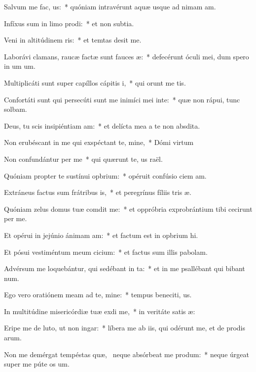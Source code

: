 \item Salvum me fac, us:~* quóniam intravérunt aquæ usque ad nimam am.
\item Infíxus sum in limo prodi:~* et non  subtia.
\item Veni in altitúdinem ris:~* et temtas desit me.
\item Laborávi clamans, raucæ factæ sunt fauces æ:~* defecérunt óculi mei, dum spero in um um.
\item Multiplicáti sunt super capíllos cápitis i,~* qui orunt me tis.
\item Confortáti sunt qui persecúti sunt me inimíci mei inte:~* quæ non rápui, tunc solbam.
\item Deus, tu scis insipiéntiam am:~* et delícta mea a te non  absdita.
\item Non erubéscant in me qui exspéctant te, mine,~* Dómi virtum
\item Non confundántur per me~* qui quærunt te, us raël.
\item Quóniam propter te sustínui opbrium:~* opéruit confúsio ciem am.
\item Extráneus factus sum frátribus is,~* et peregrínus fíliis tris æ.
\item Quóniam zelus domus tuæ comdit me:~* et oppróbria exprobrántium tibi cecirunt per me.
\item Et opérui in jejúnio ánimam am:~* et factum est in opbrium hi.
\item Et pósui vestiméntum meum cicium:~* et factus sum illis  pabolam.
\item Advérsum me loquebántur, qui sedébant in ta:~* et in me psallébant qui bibant num.
\item Ego vero oratiónem meam ad te, mine:~* tempus beneciti, us.
\item In multitúdine misericórdiæ tuæ exdi me,~* in veritáte satis æ:
\item Eripe me de luto, ut non ingar:~* líbera me ab iis, qui odérunt me, et de prodis arum.
\item Non me demérgat tempéstas quæ,~\pscross{} neque absórbeat me produm:~* neque úrgeat super me púte os um.
